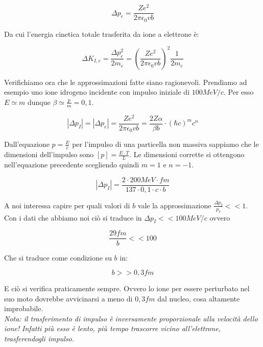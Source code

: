 \begin{equation}
\Delta p_e=\frac{Ze^2}{2\pi\epsilon_0vb}
\end{equation}

Da cui l'energia cinetica totale trasferita da ione a elettrone è:

\begin{equation}
\Delta K_{I,e}=\frac{\Delta p_e^2}{2m_e}=(\frac{Ze^2}{2\pi\epsilon_0vb})^2\frac{1}{2m_e}
\end{equation}

Verifichiamo ora che le approssimazioni fatte siano ragionevoli. Prendiamo ad esempio uno ione idrogeno incidente con impulso iniziale di $100 MeV/c$. Per esso $E\simeq m$ dunque $\beta\simeq\frac{p}{m}=0,1$.

\begin{equation}
 |\Delta p_I|=|\Delta p_e|=\frac{Ze^2}{2\pi\epsilon_0vb}=\frac{2Z\alpha}{\beta b}\cdot(\hbar c)^mc^n  
\end{equation}

Dall'equazione $p=\frac{E}{c}$ per l'impulso di una particella non massiva sappiamo che le dimensioni dell'impulso sono $[p]=\frac{E\cdot T}{L}$. Le dimensioni corrette si ottengono nell'equazione precedente scegliendo quindi $m=1$ e $n=-1$.

\begin{equation}
|\Delta p_I|=\frac{2\cdot 200 MeV\cdot fm}{137 \cdot 0,1 \cdot c \cdot b}
\end{equation}

A noi interessa capire per quali valori di $b$ vale la approssimazione $\frac{\Delta p_I}{p_I}<<1$. 
Con i dati che abbiamo noi ciò si traduce in $\Delta p_I<<100 MeV/c$ ovvero 

\begin{equation}
\frac{29 fm}{b}<<100
\end{equation}

Che si traduce come condizione su $b$ in:

\begin{equation}
b>>0,3 fm
\end{equation}

E ciò si verifica praticamente sempre. Ovvero lo ione per essere perturbato nel suo moto dovrebbe avvicinarsi a meno di $0,3 fm$ dal nucleo, cosa altamente improbabile.\\

\emph{Nota: il trasferimento di impulso è inversamente proporzionale alla velocità dello ione! Infatti più esso è lento, più tempo trascorre vicino all'elettrone, trasferendogli impulso.}\\


